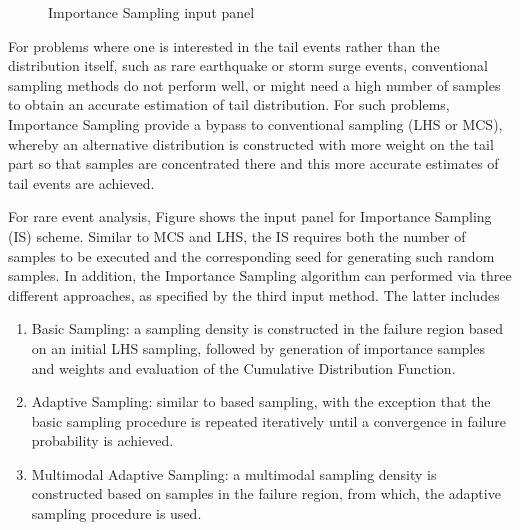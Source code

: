 \begin{figure}[!htbp]
  \caption{Importance Sampling input panel}
  \label{fig:is}
\end{figure}

For problems where one is interested in the tail events rather than the distribution itself, such as rare earthquake or storm surge events, conventional sampling methods do not perform well, or might need a high number of samples to obtain an accurate estimation of tail distribution. For such problems, Importance Sampling provide a bypass to conventional sampling (LHS or MCS), whereby an alternative distribution is constructed with more weight on the tail part so that samples are concentrated there and this more accurate estimates of tail events are achieved. 

For rare event analysis, Figure  shows the input panel for Importance Sampling (IS) scheme. Similar to MCS and LHS, the IS requires both the number of samples to be executed and the corresponding seed for generating such random samples. In addition, the Importance Sampling algorithm can performed via three different approaches, as specified by the third input method. The latter includes

\begin{enumerate}
\item Basic Sampling: a sampling density is constructed in the failure region based on an initial LHS sampling, followed by generation of importance samples and weights and evaluation of the Cumulative Distribution Function.  
\item Adaptive Sampling: similar to based sampling, with the exception that the basic sampling procedure is repeated iteratively until a convergence in failure probability is achieved. 
\item Multimodal Adaptive Sampling: a multimodal sampling density is constructed based on samples in the failure region, from which, the adaptive sampling procedure is used.
\end{enumerate}

